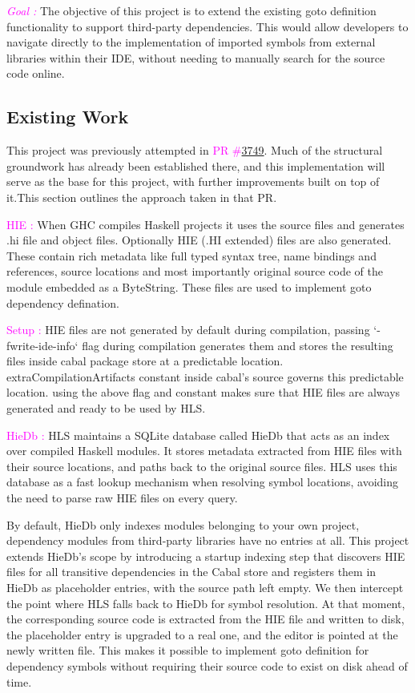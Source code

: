 \documentclass[a4paper,12pt]{article}
\newcommand{\pull}[1]{\href{https://github.com/haskell/haskell-language-server/pull/#1}{#1}}
\begin{document}
\textcolor{magenta}{\textit{Goal :  }} The objective of this project is to extend the existing goto definition functionality to support third-party dependencies. This would allow developers to navigate directly to the implementation of imported symbols from external libraries within their IDE, without needing to manually search for the source code online.

\subsection{Existing Work}
This project was previously attempted in \textcolor{magenta}{PR \#}\pull{3749}. Much of the structural groundwork has already been established there, and this implementation will serve as the base for this project, with further improvements built on top of it.This section outlines the approach taken in that PR.
\vspace{0.6em}

\textcolor{magenta}{HIE :  } When GHC compiles Haskell projects it uses the source files and generates .hi file and object files. Optionally HIE (.HI extended) files are also generated. These contain rich metadata like full typed syntax tree, name bindings and references, source locations and most importantly original source code of the module embedded as a ByteString. These files are used to implement goto dependency defination.
\vspace{0.6em}

\textcolor{magenta}{Setup :  } HIE files are not generated by default during compilation, passing `-fwrite-ide-info` flag during compilation generates them and stores the resulting files inside cabal package store at a predictable location. extraCompilationArtifacts  constant inside cabal's source governs this predictable location. using the above flag and constant makes sure that HIE files are always generated and ready to be used by HLS.
\vspace{0.6em}

\textcolor{magenta}{HieDb :  }
HLS maintains a SQLite database called HieDb that acts as an index over compiled Haskell modules. It stores metadata extracted from HIE files with their source locations, and paths back to the original source files. HLS uses this database as a fast lookup mechanism when resolving symbol locations, avoiding the need to parse raw HIE files on every query.
\vspace{0.6em}

By default, HieDb only indexes modules belonging to your own project, dependency modules from third-party libraries have no entries at all. This project extends HieDb's scope by introducing a startup indexing step that discovers HIE files for all transitive dependencies in the Cabal store and registers them in HieDb as placeholder entries, with the source path left empty. We then intercept the point where HLS falls back to HieDb for symbol resolution. At that moment, the corresponding source code is extracted from the HIE file and written to disk, the placeholder entry is upgraded to a real one, and the editor is pointed at the newly written file. This makes it possible to implement goto definition for dependency symbols without requiring their source code to exist on disk ahead of time.
\end{document}
